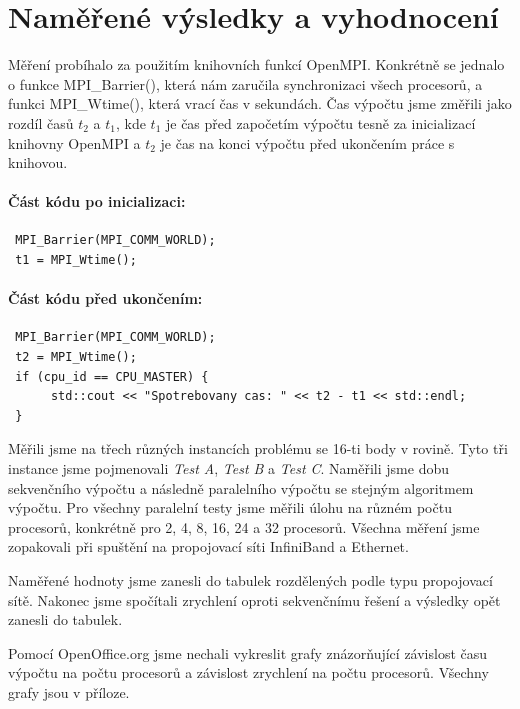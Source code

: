 \documentclass[12pt]{article}
\begin{document}

\section{Naměřené výsledky a vyhodnocení}
Měření probíhalo za použitím knihovních funkcí OpenMPI. Konkrétně se jednalo o funkce MPI\_Barrier(), 
která nám zaručila synchronizaci všech procesorů, a funkci MPI\_Wtime(), která vrací čas v sekundách.
Čas výpočtu jsme změřili jako rozdíl časů \(t_2\) a \(t_1\), kde \(t_1\) je čas před započetím výpočtu
tesně za inicializací knihovny OpenMPI a \(t_2\) je čas na konci výpočtu před ukončením práce s knihovou.

\paragraph{Část kódu po inicializaci:}
\begin{verbatim}
 MPI_Barrier(MPI_COMM_WORLD);
 t1 = MPI_Wtime();
\end{verbatim}
\paragraph{Část kódu před ukončením:}
\begin{verbatim}
 MPI_Barrier(MPI_COMM_WORLD);
 t2 = MPI_Wtime();
 if (cpu_id == CPU_MASTER) {
      std::cout << "Spotrebovany cas: " << t2 - t1 << std::endl;
 }
\end{verbatim}

Měřili jsme na třech různých instancích problému se 16-ti body v rovině. Tyto tři instance jsme
pojmenovali \emph{Test A}, \emph{Test B} a \emph{Test C}. Naměřili jsme dobu sekvenčního výpočtu
a následně paralelního výpočtu se stejným algoritmem výpočtu. Pro všechny paralelní testy jsme měřili úlohu na
různém počtu procesorů, konkrétně pro 2, 4, 8, 16, 24 a 32 procesorů. Všechna měření jsme zopakovali
při spuštění na propojovací síti InfiniBand a Ethernet.

Naměřené hodnoty jsme zanesli do tabulek rozdělených podle typu propojovací sítě. Nakonec jsme spočítali
zrychlení oproti sekvenčnímu řešení a výsledky opět zanesli do tabulek.

Pomocí OpenOffice.org jsme nechali vykreslit grafy znázorňující závislost času výpočtu na počtu procesorů
a závislost zrychlení na počtu procesorů. Všechny grafy jsou v příloze.
\end{document}

